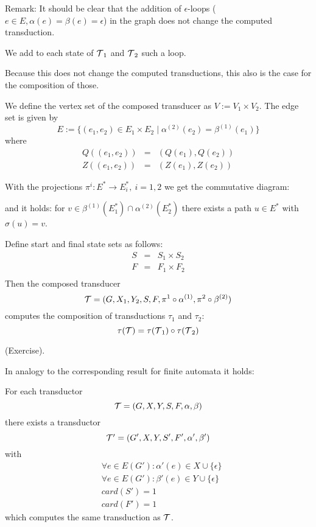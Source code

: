 Remark: It should be clear that the addition of $\epsilon$-loops ($e \in E,
\alpha(e) = \beta(e) = \epsilon$) in the graph does not change the computed
transduction.

We add to each state of $\mbox{$\mathcal{T}$}_1$ and $\mbox{$\mathcal{T}$}_2$ such a loop.

Because this does not change the computed transductions, this also is the case
for the composition of those.

We define the vertex set of the composed transducer as $V := V_1 \times V_2$.
The edge set is given by
\[ E := \{ (e_1, e_2) \in E_1 \times E_2 \mid \alpha^{(2)}(e_2) =
\beta^{(1)}(e_1) \} \]
where
\begin{eqnarray*}
Q((e_1, e_2)) & = & (Q(e_1), Q(e_2)) \\
Z((e_1, e_2)) & = & (Z(e_1), Z(e_2)) 
\end{eqnarray*}

With the projections $\pi^i : E^* \to E_i^*,\ i = 1,2$ we get the commutative
diagram:

\begin{center}
\end{center}

and it holds: for $v \in \beta^{(1)}(E_1^*) \cap \alpha^{(2)}(E_2^*)$ there
exists a path $u \in E^*$ with $\sigma(u) = v$.

Define start and final state sets as follows:
\begin{eqnarray*}
S & = & S_1 \times S_2 \\
F & = & F_1 \times F_2 \\
\end{eqnarray*}
Then the composed transducer
\[\mbox{$\mathcal{T}$} = (G, X_1, Y_2, S, F, \pi^1 \circ \alpha^{(1)}, \pi^2 \circ
\beta^{(2)})\]
computes the composition of transductions $\tau_1$ and $\tau_2$:
\[ \tau(\mbox{$\mathcal{T}$}) = \tau(\mbox{$\mathcal{T}$}_1) \circ \tau(\mbox{$\mathcal{T}$}_2) \]

(Exercise).

In analogy to the corresponding result for finite automata it holds:

\begin{lemma}
For each transductor
\[\mbox{$\mathcal{T}$} = (G, X, Y, S, F, \alpha, \beta)\] there exists a
transductor \[\mbox{$\mathcal{T'}$} = (G', X, Y, S', F', \alpha', \beta')\] with
\begin{eqnarray*}
& \forall e \in E(G'): \alpha'(e) \in X \cup \{\epsilon\} \\
& \forall e \in E(G'): \beta'(e) \in Y \cup \{\epsilon\} \\
& card(S') = 1 \\
& card(F') = 1
\end{eqnarray*}
which computes the same transduction as $\mbox{$\mathcal{T}$}$.
\end{lemma}


